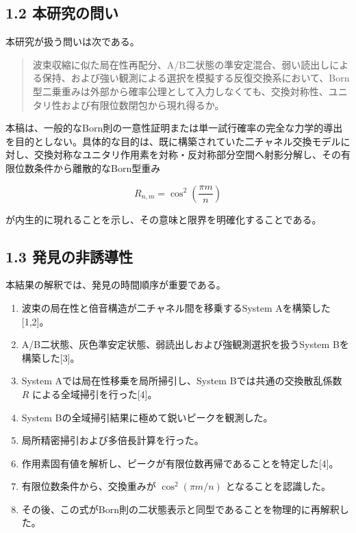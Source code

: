 \documentclass[
  a4paper,
  10pt]{article}
\providecommand{\tightlist}{%
  \setlength{\itemsep}{0pt}\setlength{\parskip}{0pt}}
\begin{document}
\subsection{1.2
本研究の問い}\label{12-ux672cux7814ux7a76ux306eux554fux3044}

本研究が扱う問いは次である。

\begin{quote}
波束収縮に似た局在性再配分、A/B二状態の準安定混合、弱い読出しによる保持、および強い観測による選択を模擬する反復交換系において、Born型二乗重みは外部から確率公理として入力しなくても、交換対称性、ユニタリ性および有限位数閉包から現れ得るか。
\end{quote}

本稿は、一般的なBorn則の一意性証明または単一試行確率の完全な力学的導出を目的としない。具体的な目的は、既に構築されていた二チャネル交換モデルに対し、交換対称なユニタリ作用素を対称・反対称部分空間へ射影分解し、その有限位数条件から離散的なBorn型重み

\[
R_{n,m}=\cos^2\left(\frac{\pi m}{n}\right)
\]

が内生的に現れることを示し、その意味と限界を明確化することである。

\subsection{1.3
発見の非誘導性}\label{13-ux767aux898bux306eux975eux8a98ux5c0eux6027}

本結果の解釈では、発見の時間順序が重要である。

\begin{enumerate}
\def\labelenumi{\arabic{enumi}.}
\tightlist
\item
  波束の局在性と倍音構造が二チャネル間を移乗するSystem
  Aを構築した{[}1,2{]}。
\item
  A/B二状態、灰色準安定状態、弱読出しおよび強観測選択を扱うSystem
  Bを構築した{[}3{]}。
\item
  System Aでは局在性移乗を局所掃引し、System Bでは共通の交換散乱係数
  \(R\) による全域掃引を行った{[}4{]}。
\item
  System Bの全域掃引結果に極めて鋭いピークを観測した。
\item
  局所精密掃引および多倍長計算を行った。
\item
  作用素固有値を解析し、ピークが有限位数再帰であることを特定した{[}4{]}。
\item
  有限位数条件から、交換重みが \(\cos^2(\pi m/n)\)
  となることを認識した。
\item
  その後、この式がBorn則の二状態表示と同型であることを物理的に再解釈した。
\end{enumerate}
\end{document}
